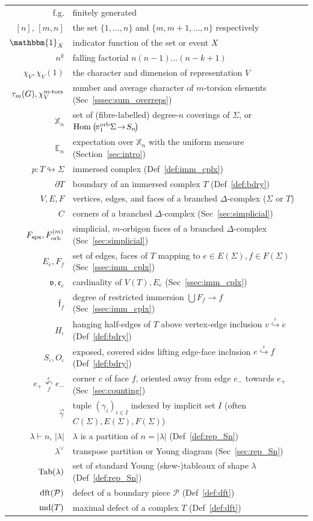 \documentclass{amsart}
\newcommand{\corner}[1][]{
 \underset{f#1}
 {
  \overset{c#1}{\curvearrowleft}
 }
}
\newcommand{\covers}{\mathbb{X}_n}
\newcommand{\dft}{\textnormal{dft}}
\newcommand{\Fspx}{F_{\textnormal{spx}}}
\newcommand{\Forb}[1][m]{F^{(#1)}_{\textnormal{orb}}}
\newcommand{\Hom}[3][]{\tn{Hom}_{#1}\left(#2\to #3\right)}
\newcommand{\md}{\textnormal{md}}
\newcommand{\pio}{\pi_1^{\textnormal{orb}}}
\newcommand{\tn}{\textnormal}
\begin{document}
\noindent
\begin{tabular}{rl}
f.g.&finitely generated\\
$[n]$, $[m,n]$&the set $\{1,\dots,n\}$ and $\{m,m+1,\dots,n\}$ respectively\\
$\mathbbm{1}_X$&indicator function of the set or event $X$\\
$n^{\underline{k}}$&falling factorial $n(n-1)\dots(n-k+1)$\\
$\chi_V,\chi_V(1)$&the character and dimension of representation $V$\\
$\tau_m(G),\chi^{m\tn{-tors}}_V$&number and average character of $m$-torsion elements (Sec~\ref{sssec:sum_overreps})\\
$\covers$&set of (fibre-labelled) degree-$n$ coverings of $\Sigma$, or $\Hom{\!\pio\Sigma\!}{\!S_n\!}$\\
$\mathbb{E}_n$&expectation over $\covers$ with the uniform measure (Section~\ref{sec:intro})\\
$p\colon T\looparrowright\Sigma$&immersed complex (Def~\ref{def:imm_cplx})\\
$\partial T$&boundary of an immersed complex $T$ (Def~\ref{def:bdry})\\
$V,E,F$&vertices, edges, and faces of a branched $\Delta$-complex ($\Sigma$ or $T$)\\
$C$&corners of a branched $\Delta$-complex (Sec~\ref{sec:simplicial})\\
$\Fspx,\Forb$&simplicial, $m$-orbigon faces of a branched $\Delta$-complex (Sec~\ref{sec:simplicial})\\
$E_e,F_f$&set of edges, faces of $T$ mapping to $e\in E(\Sigma),f\in F(\Sigma)$ (Sec~\ref{ssec:imm_cplx})\\
$\mathfrak{v},\mathfrak{e}_e$&cardinality of $V(T),E_e$ (Sec~\ref{ssec:imm_cplx})\\
$\mathfrak{f}_f$&degree of restricted immersion $\bigcup F_f\to f$ (Sec~\ref{ssec:imm_cplx})\\
$H_\iota$&hanging half-edges of $T$ above vertex-edge inclusion $v\!\stackrel{\iota}{\hookrightarrow}\!e$ (Def~\ref{def:bdry})\\
$S_\iota,O_\iota$&exposed, covered sides lifting edge-face inclusion $e\stackrel{\iota}{\hookrightarrow}f$ (Def~\ref{def:bdry})\\
$e_+\corner e_-$&corner $c$ of face $f$, oriented away from edge $e_-$ towards $e_+$ (Sec~\ref{sec:counting})\\
$\vec\gamma$&tuple $(\gamma_i)_{i\in I}$ indexed by implicit set $I$ (often $C(\Sigma),E(\Sigma),F(\Sigma)$)\\
$\lambda\vdash n$, $|\lambda|$&$\lambda$ is a partition of $n=|\lambda|$ (Def~\ref{def:rep_Sn})\\
$\lambda^\vee$&transpose partition or Young diagram (Sec~\ref{sec:rep_Sn})\\
$\tn{Tab}(\lambda)$&set of standard Young (skew-)tableaux of shape $\lambda$ (Def~\ref{def:rep_Sn})\\
$\dft(\mathcal{P})$&defect of a boundary piece $\mathcal{P}$ (Def~\ref{def:dft})\\
$\md(T)$&maximal defect of a complex $T$ (Def~\ref{def:dft})
\end{tabular}
\end{document}
